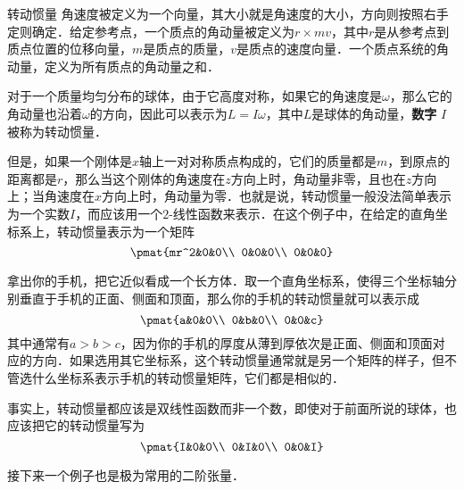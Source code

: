 \begin{example}{转动惯量}
角速度被定义为一个向量，其大小就是角速度的大小，方向则按照右手定则确定．给定参考点，一个质点的角动量被定义为${r}\times m{v}$，其中${r}$是从参考点到质点位置的位移向量，$m$是质点的质量，${v}$是质点的速度向量．一个质点系统的角动量，定义为所有质点的角动量之和．

对于一个质量均匀分布的球体，由于它高度对称，如果它的角速度是${\omega}$，那么它的角动量也沿着${\omega}$的方向，因此可以表示为${L}=I{\omega}$，其中${L}$是球体的角动量，\textbf{数字} $I$ 被称为转动惯量．

但是，如果一个刚体是$x$轴上一对对称质点构成的，它们的质量都是$m$，到原点的距离都是$r$，那么当这个刚体的角速度在$z$方向上时，角动量非零，且也在$z$方向上；当角速度在$x$方向上时，角动量为零．也就是说，转动惯量一般没法简单表示为一个实数$I$，而应该用一个$2$-线性函数来表示．在这个例子中，在给定的直角坐标系上，转动惯量表示为一个矩阵
\begin{equation}
\pmat{mr^2&0&0\\ 0&0&0\\ 0&0&0}
\end{equation}

拿出你的手机，把它近似看成一个长方体．取一个直角坐标系，使得三个坐标轴分别垂直于手机的正面、侧面和顶面，那么你的手机的转动惯量就可以表示成
\begin{equation}
\pmat{a&0&0\\ 0&b&0\\ 0&0&c}
\end{equation}
其中通常有$a>b>c$，因为你的手机的厚度从薄到厚依次是正面、侧面和顶面对应的方向．如果选用其它坐标系，这个转动惯量通常就是另一个矩阵的样子，但不管选什么坐标系表示手机的转动惯量矩阵，它们都是相似的．

事实上，转动惯量都应该是双线性函数而非一个数，即使对于前面所说的球体，也应该把它的转动惯量写为
\begin{equation}
\pmat{I&0&0\\ 0&I&0\\ 0&0&I}
\end{equation}
\end{example}

接下来一个例子也是极为常用的二阶张量．

